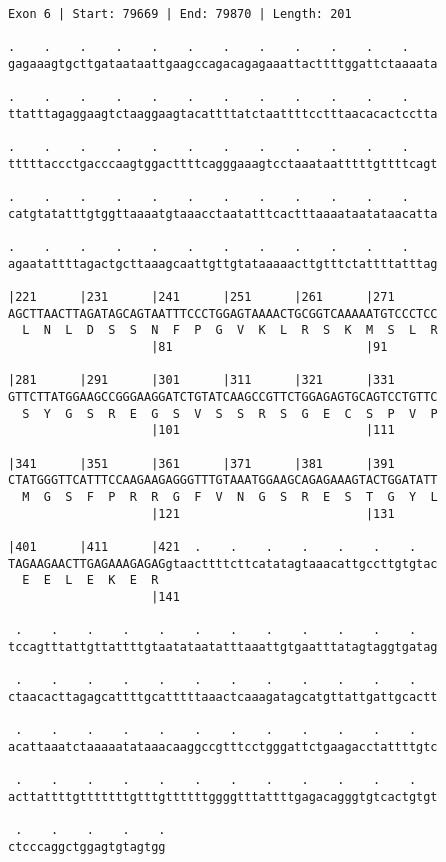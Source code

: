 \documentclass{article}
\begin{document}
\begin{Verbatim}
Exon 6 | Start: 79669 | End: 79870 | Length: 201
 
.    .    .    .    .    .    .    .    .    .    .    .    
gagaaagtgcttgataataattgaagccagacagagaaattacttttggattctaaaata
  
.    .    .    .    .    .    .    .    .    .    .    .    
ttatttagaggaagtctaaggaagtacattttatctaattttcctttaacacactcctta
  
.    .    .    .    .    .    .    .    .    .    .    .    
tttttaccctgacccaagtggacttttcagggaaagtcctaaataatttttgttttcagt
  
.    .    .    .    .    .    .    .    .    .    .    .    
catgtatatttgtggttaaaatgtaaacctaatatttcactttaaaataatataacatta
  
.    .    .    .    .    .    .    .    .    .    .    .    
agaatattttagactgcttaaagcaattgttgtataaaaacttgtttctattttatttag
  
|221      |231      |241      |251      |261      |271      
AGCTTAACTTAGATAGCAGTAATTTCCCTGGAGTAAAACTGCGGTCAAAAATGTCCCTCC
  L  N  L  D  S  S  N  F  P  G  V  K  L  R  S  K  M  S  L  R
                    |81                           |91       
  
|281      |291      |301      |311      |321      |331      
GTTCTTATGGAAGCCGGGAAGGATCTGTATCAAGCCGTTCTGGAGAGTGCAGTCCTGTTC
  S  Y  G  S  R  E  G  S  V  S  S  R  S  G  E  C  S  P  V  P
                    |101                          |111      
  
|341      |351      |361      |371      |381      |391      
CTATGGGTTCATTTCCAAGAAGAGGGTTTGTAAATGGAAGCAGAGAAAGTACTGGATATT
  M  G  S  F  P  R  R  G  F  V  N  G  S  R  E  S  T  G  Y  L
                    |121                          |131      
  
|401      |411      |421  .    .    .    .    .    .    .   
TAGAAGAACTTGAGAAAGAGAGgtaacttttcttcatatagtaaacattgccttgtgtac
  E  E  L  E  K  E  R                                       
                    |141                                    
  
 .    .    .    .    .    .    .    .    .    .    .    .   
tccagtttattgttattttgtaatataatatttaaattgtgaatttatagtaggtgatag
  
 .    .    .    .    .    .    .    .    .    .    .    .   
ctaacacttagagcattttgcatttttaaactcaaagatagcatgttattgattgcactt
  
 .    .    .    .    .    .    .    .    .    .    .    .   
acattaaatctaaaaatataaacaaggccgtttcctgggattctgaagacctattttgtc
  
 .    .    .    .    .    .    .    .    .    .    .    .   
acttattttgtttttttgtttgttttttggggtttattttgagacagggtgtcactgtgt
  
 .    .    .    .    .
ctcccaggctggagtgtagtgg
\end{Verbatim}
\end{document}
